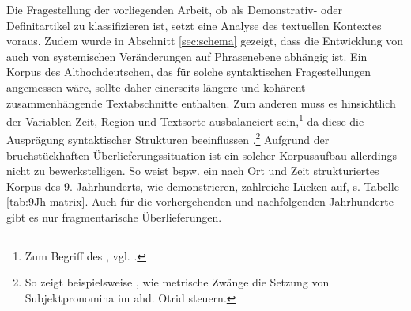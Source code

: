 Die Fragestellung der vorliegenden Arbeit, ob  als Demonstrativ- oder Definitartikel zu klassifizieren ist, setzt eine Analyse des textuellen Kontextes voraus. Zudem wurde in Abschnitt \ref{sec:schema} gezeigt, dass die Entwicklung von  auch von systemischen Veränderungen auf Phrasenebene abhängig ist. Ein Korpus des Althochdeutschen, das für solche syntaktischen Fragestellungen angemessen wäre, sollte daher einerseits längere und kohärent zusammenhängende Textabschnitte enthalten. Zum anderen muss es hinsichtlich der Variablen Zeit, Region und Textsorte ausbalanciert sein,\footnote{Zum Begriff des , vgl. \cite[6]{Atkins1992}.} da diese die Ausprägung syntaktischer Strukturen beeinflussen \parencite[74]{Fleischer2011}.\footnote{So zeigt beispielsweise \textcite[47]{Eggenberger1961}, wie metrische Zwänge die Setzung von Subjektpronomina im ahd. Otrid steuern.} Aufgrund der bruchstückhaften Überlieferungssituation ist ein solcher Korpusaufbau allerdings nicht zu bewerkstelligen. So weist bspw. ein nach Ort und Zeit strukturiertes Korpus des 9. Jahrhunderts, wie \textcite{Fleischer2011} demonstrieren, zahlreiche Lücken auf,  s. Tabelle \ref{tab:9Jh-matrix}. Auch für die vorhergehenden und nachfolgenden Jahrhunderte gibt es nur fragmentarische Überlieferungen.

\begin{table}
\caption{Strukturiertes Korpus des 9. Jh. \parencite[75]{Fleischer2011} (T = Tatian, O = Otfrid, MF = Monseer Fragmente)\label{tab:9Jh-matrix}}
\end{table}  

